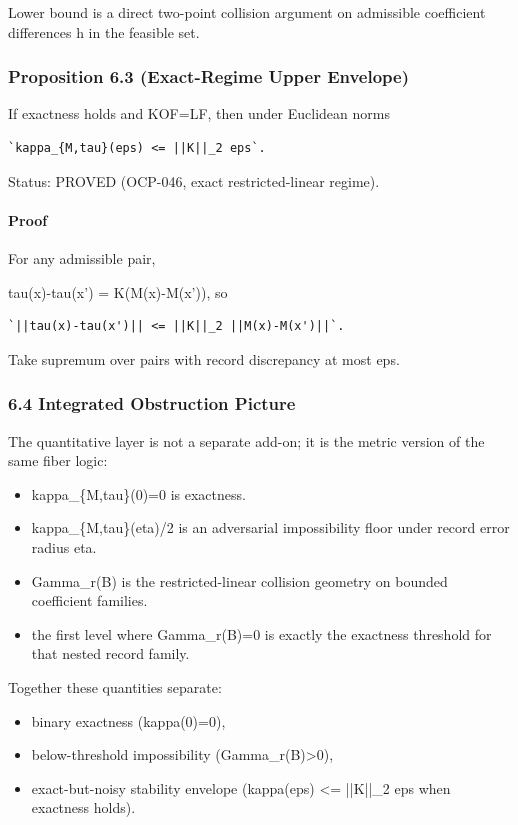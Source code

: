 \documentclass[11pt]{article}
\begin{document}
Lower bound is a direct two-point collision argument on admissible coefficient differences h in the feasible set.


\subsubsection*{Proposition 6.3 (Exact-Regime Upper Envelope)}
If exactness holds and KOF=LF, then under Euclidean norms


\begin{verbatim}
`kappa_{M,tau}(eps) <= ||K||_2 eps`.
\end{verbatim}

Status: PROVED (OCP-046, exact restricted-linear regime).


\paragraph{Proof}
For any admissible pair,

tau(x)-tau(x') = K(M(x)-M(x')), so

\begin{verbatim}
`||tau(x)-tau(x')|| <= ||K||_2 ||M(x)-M(x')||`.
\end{verbatim}
Take supremum over pairs with record discrepancy at most eps.


\subsubsection*{6.4 Integrated Obstruction Picture}
The quantitative layer is not a separate add-on; it is the metric version of the same fiber logic:


\begin{itemize}
\item kappa\_\{M,tau\}(0)=0 is exactness.
\item kappa\_\{M,tau\}(eta)/2 is an adversarial impossibility floor under record error radius eta.
\item Gamma\_r(B) is the restricted-linear collision geometry on bounded coefficient families.
\item the first level where Gamma\_r(B)=0 is exactly the exactness threshold for that nested record family.
\end{itemize}

Together these quantities separate:

\begin{itemize}
\item binary exactness (kappa(0)=0),
\item below-threshold impossibility (Gamma\_r(B)>0),
\item exact-but-noisy stability envelope (kappa(eps) <= ||K||\_2 eps when exactness holds).
\end{itemize}
\end{document}
